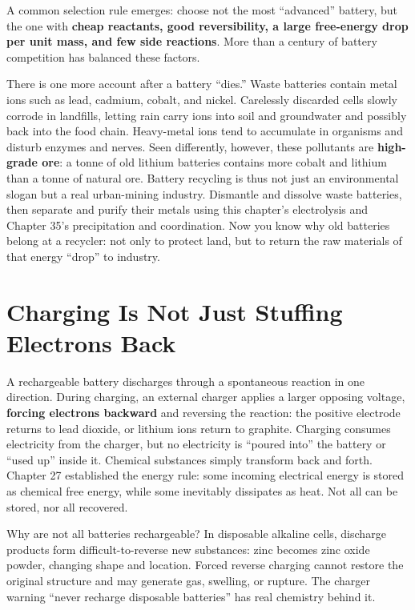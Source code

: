A common selection rule emerges: choose not the most ``advanced'' battery, but the one with \textbf{cheap reactants, good reversibility, a large free-energy drop per unit mass, and few side reactions}. More than a century of battery competition has balanced these factors.

There is one more account after a battery ``dies.'' Waste batteries contain metal ions such as lead, cadmium, cobalt, and nickel. Carelessly discarded cells slowly corrode in landfills, letting rain carry ions into soil and groundwater and possibly back into the food chain. Heavy-metal ions tend to accumulate in organisms and disturb enzymes and nerves. Seen differently, however, these pollutants are \textbf{high-grade ore}: a tonne of old lithium batteries contains more cobalt and lithium than a tonne of natural ore. Battery recycling is thus not just an environmental slogan but a real urban-mining industry. Dismantle and dissolve waste batteries, then separate and purify their metals using this chapter's electrolysis and Chapter 35's precipitation and coordination. Now you know why old batteries belong at a recycler: not only to protect land, but to return the raw materials of that energy ``drop'' to industry.

\section{Charging Is Not Just Stuffing Electrons Back}

A rechargeable battery discharges through a spontaneous reaction in one direction. During charging, an external charger applies a larger opposing voltage, \textbf{forcing electrons backward} and reversing the reaction: the positive electrode returns to lead dioxide, or lithium ions return to graphite. Charging consumes electricity from the charger, but no electricity is ``poured into'' the battery or ``used up'' inside it. Chemical substances simply transform back and forth. Chapter 27 established the energy rule: some incoming electrical energy is stored as chemical free energy, while some inevitably dissipates as heat. Not all can be stored, nor all recovered.

Why are not all batteries rechargeable? In disposable alkaline cells, discharge products form difficult-to-reverse new substances: zinc becomes zinc oxide powder, changing shape and location. Forced reverse charging cannot restore the original structure and may generate gas, swelling, or rupture. The charger warning ``never recharge disposable batteries'' has real chemistry behind it.

